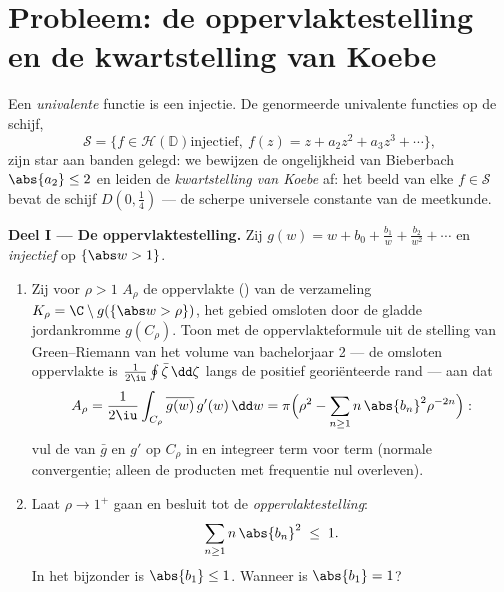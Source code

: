 \section{Probleem: de oppervlaktestelling en de kwartstelling van
Koebe}

\begin{problem}\label{pb:b3:conformal:1}
Een \emph{univalente} functie is een  injectie. De
genormeerde univalente functies op de schijf,
\[
\mathcal S = \bigl\{f \in \mathcal H(\mathbb D) \text{
injectief},\ f(z) = z + a_2z^2 + a_3z^3 + \cdots\bigr\},
\]
zijn star aan banden gelegd: we bewijzen de ongelijkheid van
Bieberbach $\abs{a_2} \leq 2$ en leiden de \emph{kwartstelling
van Koebe} af: het beeld van elke $f \in \mathcal S$ bevat de
schijf $D(0, \frac14)$ --- de scherpe universele constante van de
 meetkunde.

\medskip
\noindent\textbf{Deel I --- De oppervlaktestelling.} Zij $g(w) =
w + b_0 + \frac{b_1}w + \frac{b_2}{w^2} + \cdots$  en
\emph{injectief} op $\{\abs w > 1\}$.
\begin{enumerate}
  \item Zij voor $\rho > 1$ $A_\rho$ de oppervlakte ()
        van de  verzameling $K_\rho = \C\setminus
        g(\{\abs w > \rho\})$, het gebied omsloten door de gladde
        jordankromme $g(C_\rho)$. Toon met de oppervlakteformule
        uit de stelling van Green--Riemann van het volume van
        bachelorjaar 2 --- de omsloten oppervlakte is
        $\frac1{2\iu} \oint\bar\zeta\,\dd\zeta$ langs de positief
        georiënteerde rand --- aan dat
        \[
        A_\rho = \frac{1}{2\iu}\int_{C_\rho}
        \overline{g(w)}\,g'(w)\,\dd w
        = \pi\Bigl(\rho^2 -
        \sum_{n\geq1}n\,\abs{b_n}^2\rho^{-2n}\Bigr) :
        \]
        vul de  van $\bar g$ en $g'$ op $C_\rho$ in
        en integreer term voor term (normale convergentie; alleen
        de producten met frequentie nul overleven).
  \item Laat $\rho \to 1^+$ gaan en besluit tot de
        \emph{oppervlaktestelling}:
        \[
        \sum_{n\geq1}n\,\abs{b_n}^2 \;\leq\; 1 .
        \]
        In het bijzonder is $\abs{b_1} \leq 1$. Wanneer is
        $\abs{b_1} = 1$?
\end{enumerate}


\end{problem}
